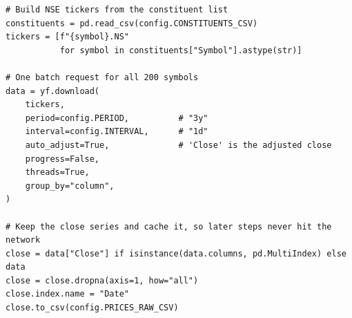 \begin{lstlisting}[style=python]
# Build NSE tickers from the constituent list
constituents = pd.read_csv(config.CONSTITUENTS_CSV)
tickers = [f"{symbol}.NS"
           for symbol in constituents["Symbol"].astype(str)]

# One batch request for all 200 symbols
data = yf.download(
    tickers,
    period=config.PERIOD,          # "3y"
    interval=config.INTERVAL,      # "1d"
    auto_adjust=True,              # 'Close' is the adjusted close
    progress=False,
    threads=True,
    group_by="column",
)

# Keep the close series and cache it, so later steps never hit the network
close = data["Close"] if isinstance(data.columns, pd.MultiIndex) else data
close = close.dropna(axis=1, how="all")
close.index.name = "Date"
close.to_csv(config.PRICES_RAW_CSV)
\end{lstlisting}

